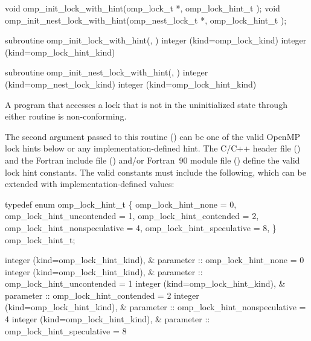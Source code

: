 \format
\ccppspecificstart
\begin{boxedcode}
void omp\_init\_lock\_with\_hint(omp\_lock\_t *, 
                             omp\_lock\_hint\_t );
void omp\_init\_nest\_lock\_with\_hint(omp\_nest\_lock\_t *, 
                                  omp\_lock\_hint\_t );
\end{boxedcode}
\ccppspecificend

\fortranspecificstart
\begin{boxedcode}
subroutine omp\_init\_lock\_with\_hint(, )
integer (kind=omp\_lock\_kind) 
integer (kind=omp\_lock\_hint\_kind) 

subroutine omp\_init\_nest\_lock\_with\_hint(, )
integer (kind=omp\_nest\_lock\_kind) 
integer (kind=omp\_lock\_hint\_kind) 
\end{boxedcode}
\fortranspecificend

\constraints
A program that accesses a lock that is not in the uninitialized state through either routine 
is non-conforming.

The second argument passed to this routine () can be one of the valid OpenMP lock hints below or any implementation-defined hint. 
The C/C++ header file () and the Fortran include file () and/or Fortran~90 module file () define the valid lock hint constants.  
The valid constants must include the following, which can be extended with implementation-defined values:

\ccppspecificstart
\begin{codepar}
typedef enum omp\_lock\_hint\_t \{
  omp\_lock\_hint\_none = 0,
  omp\_lock\_hint\_uncontended = 1,
  omp\_lock\_hint\_contended = 2,
  omp\_lock\_hint\_nonspeculative = 4,
  omp\_lock\_hint\_speculative = 8,
\} omp\_lock\_hint\_t;
\end{codepar}
\ccppspecificend

\fortranspecificstart
\begin{codepar}
integer (kind=omp\_lock\_hint\_kind), &
        parameter :: omp\_lock\_hint\_none = 0
integer (kind=omp\_lock\_hint\_kind), &
        parameter :: omp\_lock\_hint\_uncontended = 1
integer (kind=omp\_lock\_hint\_kind), &
        parameter :: omp\_lock\_hint\_contended = 2
integer (kind=omp\_lock\_hint\_kind), &
        parameter :: omp\_lock\_hint\_nonspeculative = 4 
integer (kind=omp\_lock\_hint\_kind), &
        parameter :: omp\_lock\_hint\_speculative = 8
\end{codepar}
\fortranspecificend

